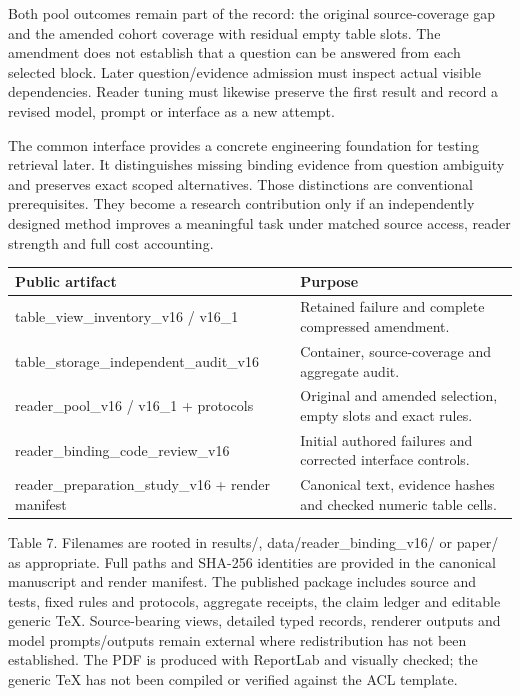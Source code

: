 \documentclass[10pt,a4paper]{article}
\begin{document}
Both pool outcomes remain part of the record: the original source-coverage gap and the amended cohort coverage with residual empty table slots. The amendment does not establish that a question can be answered from each selected block. Later question/evidence admission must inspect actual visible dependencies. Reader tuning must likewise preserve the first result and record a revised model, prompt or interface as a new attempt.

The common interface provides a concrete engineering foundation for testing retrieval later. It distinguishes missing binding evidence from question ambiguity and preserves exact scoped alternatives. Those distinctions are conventional prerequisites. They become a research contribution only if an independently designed method improves a meaningful task under matched source access, reader strength and full cost accounting.

\begin{longtable}{@{}p{}p{}@{}}\toprule
\textbf{Public artifact} & \textbf{Purpose} \\ \midrule\endhead
table\_view\_inventory\_v16 / v16\_1 & Retained failure and complete compressed amendment. \\
table\_storage\_independent\_audit\_v16 & Container, source-coverage and aggregate audit. \\
reader\_pool\_v16 / v16\_1 + protocols & Original and amended selection, empty slots and exact rules. \\
reader\_binding\_code\_review\_v16 & Initial authored failures and corrected interface controls. \\
reader\_preparation\_study\_v16 + render manifest & Canonical text, evidence hashes and checked numeric table cells. \\
\bottomrule\end{longtable}
{\small Table 7. Filenames are rooted in results/, data/reader\_binding\_v16/ or paper/ as appropriate. Full paths and SHA-256 identities are provided in the canonical manuscript and render manifest.}
The published package includes source and tests, fixed rules and protocols, aggregate receipts, the claim ledger and editable generic TeX. Source-bearing views, detailed typed records, renderer outputs and model prompts/outputs remain external where redistribution has not been established. The PDF is produced with ReportLab and visually checked; the generic TeX has not been compiled or verified against the ACL template.
\end{document}
